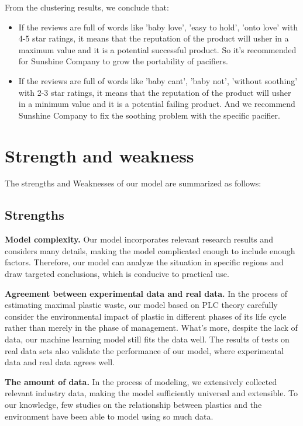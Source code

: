 \documentclass{mcmthesis}
\begin{document}
From the clustering results, we conclude that:
\begin{itemize}
	\item If the reviews are full of words like 'baby love', 'easy to hold', 'onto love' with 4-5 star ratings, it means that the reputation of the product will usher in a maximum value and it is a potential successful product. So it's recommended for Sunshine Company to grow the portability of pacifiers.
	\item If the reviews are full of words like 'baby cant', 'baby not', 'without soothing' with 2-3 star ratings, it means that the reputation of the product will usher in a minimum value and it is a potential failing product. And we recommend Sunshine Company to fix the soothing problem with the specific pacifier.
\end{itemize}
\section{Strength and weakness}


The strengths and Weaknesses of our model are summarized as follows:

\subsection{Strengths}

\textbf{Model complexity.} Our model incorporates relevant research results and considers many details, making the model complicated enough to include enough factors. Therefore, our model can analyze the situation in specific regions and draw targeted conclusions, which is conducive to practical use.

\textbf{Agreement between experimental data and real data.} In the process of estimating maximal plastic waste, our model based on PLC theory carefully consider the environmental impact of plastic in different phases of its life cycle rather than merely in the phase of management. What's more, despite the lack of data, our machine learning model still fits the data well. The results of tests on real data sets also validate the performance of our model, where experimental data and real data agrees well. 

\textbf{The amount of data.} In the process of modeling, we extensively collected relevant industry data, making the model sufficiently universal and extensible. To our knowledge, few studies on the relationship between plastics and the environment have been able to model using so much data.
\end{document}
